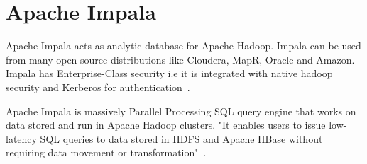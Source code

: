 \section{Apache Impala}

Apache Impala acts as analytic database for Apache Hadoop. Impala can be used
from many open source distributions like Cloudera, MapR, Oracle and Amazon.
Impala has Enterprise-Class security i.e it is integrated with native hadoop
security and Kerberos for authentication~\cite{hid-sp18-401-wiki-Impala}.

Apache Impala is massively Parallel Processing SQL query engine that works on
data stored and run in Apache Hadoop clusters. "It enables users to issue low-
latency SQL queries to data stored in HDFS and Apache HBase without requiring
data movement or transformation"~\cite{hid-sp18-401-apache-Impala}.

